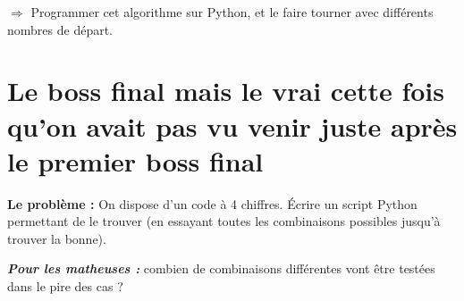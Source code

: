 \documentclass[12pt,a4paper, oneside]{article}
\begin{document}
  $\Longrightarrow$ Programmer cet algorithme sur Python, et le faire tourner avec différents nombres de départ.

\section*{Le boss final mais le vrai cette fois qu'on avait pas vu venir juste après le premier boss final}
  \textbf{Le problème :} On dispose d'un code à 4 chiffres.
  Écrire un script Python permettant de le trouver (en essayant toutes les combinaisons possibles jusqu'à trouver la bonne).

  \textbf{\textit{Pour les matheuses :}} combien de combinaisons différentes vont être testées dans le pire des cas ?
\end{document}
